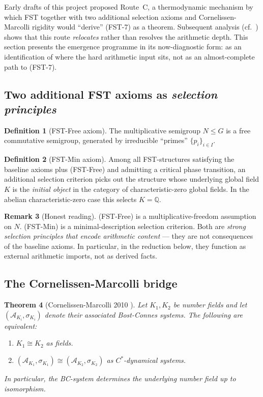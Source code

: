 \documentclass[11pt,a4paper]{article}
\theoremstyle{plain}
\newtheorem{theorem}{Theorem}[section]
\theoremstyle{definition}
\newtheorem{definition}[theorem]{Definition}
\newtheorem{remark}[theorem]{Remark}
\newcommand{\Q}{\mathbb{Q}}
\begin{document}
Early drafts of this project proposed Route~C, a thermodynamic
mechanism by which FST together with two additional selection
axioms and Cornelissen-Marcolli rigidity would ``derive'' (FST-7) as
a theorem.  Subsequent analysis
(cf.~\cite{L1KAttack,EmergenceAttack}) shows that this route
\emph{relocates} rather than resolves the arithmetic depth.  This
section presents the emergence programme in its now-diagnostic form:
as an identification of where the hard arithmetic input sits, not
as an almost-complete path to (FST-7).

\subsection{Two additional FST axioms as \emph{selection principles}}
\label{sec:extra-axioms}

\begin{definition}[FST-Free axiom]\label{def:fst-free}
The multiplicative semigroup $N \le G$ is a free commutative
semigroup, generated by irreducible ``primes'' $\{p_i\}_{i \in I}$.
\end{definition}

\begin{definition}[FST-Min axiom]\label{def:fst-min}
Among all FST-structures satisfying the baseline axioms plus
(FST-Free) and admitting a critical phase transition, an additional
selection criterion picks out the structure whose underlying global
field $K$ is the \emph{initial object} in the category of
characteristic-zero global fields.  In the abelian characteristic-zero
case this selects $K = \Q$.
\end{definition}

\begin{remark}[Honest reading]
\label{rem:fst-free-min-imports}
(FST-Free) is a multiplicative-freedom assumption on $N$.  (FST-Min)
is a minimal-description selection criterion.  Both are \emph{strong
selection principles that encode arithmetic content} --- they are
not consequences of the baseline axioms.  In particular, in the
reduction below, they function as external arithmetic imports, not
as derived facts.
\end{remark}

\subsection{The Cornelissen-Marcolli bridge}
\label{sec:cm-bridge}

\begin{theorem}[Cornelissen-Marcolli
2010 \cite{CornelissenMarcolli2010}]\label{thm:cm-rigidity}
Let $K_1, K_2$ be number fields and let $(\mathcal A_{K_i},
\sigma_{K_i})$ denote their associated Bost-Connes systems.  The
following are equivalent:
\begin{enumerate}[label=(\roman*)]
\item $K_1 \cong K_2$ as fields.
\item $(\mathcal A_{K_1}, \sigma_{K_1}) \cong (\mathcal A_{K_2},
  \sigma_{K_2})$ as $C^\ast$-dynamical systems.
\end{enumerate}
In particular, the BC-system determines the underlying number field
up to isomorphism.
\end{theorem}
\end{document}

